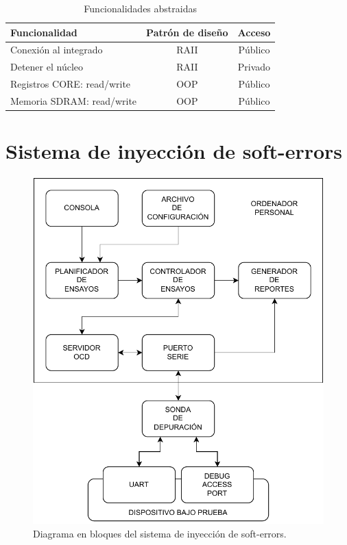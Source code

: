 \begin{table}[h]
	\centering
	\caption[Funcionalidades abstraidas]{Funcionalidades abstraidas}

	\begin{tabular}{l c c}    
		\toprule
        \textbf{Funcionalidad}     & \textbf{Patrón de diseño} & \textbf{Acceso}\\
		\midrule
		Conexión al integrado      & RAII                      & Público\\		
		Detener el núcleo          & RAII                      & Privado\\
		Registros CORE: read/write & OOP                       & Público\\
		Memoria SDRAM: read/write  & OOP                       & Público\\
		\bottomrule
		\hline
	\end{tabular}
	\label{tab:funcionalidades}
\end{table}

\section{Sistema de inyección de soft-errors}
\label{sec:sise}

\begin{figure}[htbp]
	\centering
	\includegraphics[width=\textwidth]{./Figures/siseblocks.pdf}
    \caption{Diagrama en bloques del sistema de inyección de soft-errors.}
	\label{fig:siseblocks}
\end{figure}

